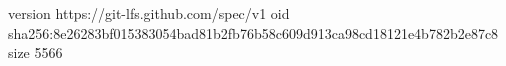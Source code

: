 version https://git-lfs.github.com/spec/v1
oid sha256:8e26283bf015383054bad81b2fb76b58c609d913ca98cd18121e4b782b2e87c8
size 5566
